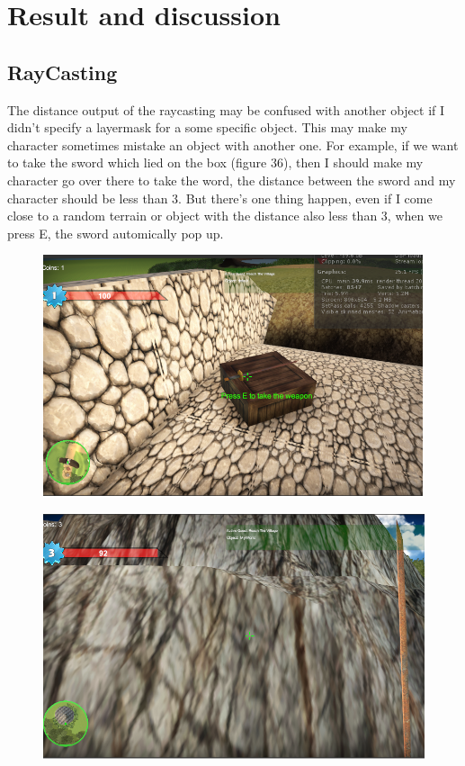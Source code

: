 \documentclass[a4paper, 13pt]{extarticle}
\begin{document}
{\section{Result and discussion}
\subsection{RayCasting} 
	The distance output of the raycasting may be confused with another object if I didn't specify a layermask for a some specific object. This may make my character sometimes mistake an object with another one. For example, if we want to take the sword which lied on the box (figure 36), then I should make my character go over there to take the word, the distance between the sword and my character should be less than 3. But there's one thing happen, even if I come close to a random terrain or object with the distance also less than 3, when we press E, the sword automically pop up.
	\begin{figure}[h]
		\begin{minipage}{.5\textwidth}
			\centering
			\includegraphics[width=1\linewidth]{intructions/Take_weapon1.png}
			\label{fig:test39}
		\end{minipage}
		\begin{minipage}{.5\textwidth}
			\centering
			\includegraphics[width=1\linewidth]{intructions/Take_weapon2.png}

\end{minipage}
\end{figure}}
\end{document}

